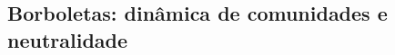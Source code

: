 \subsection{Borboletas: dinâmica de comunidades e neutralidade} %
\label{sec:dinamica-temporal-borb} 


